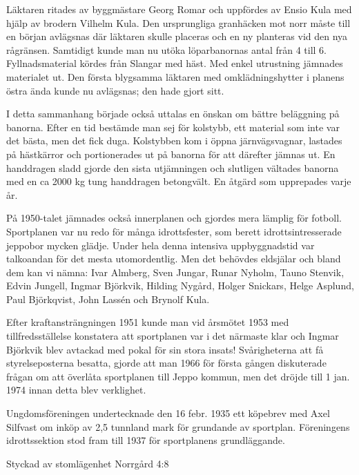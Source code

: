 Läktaren ritades av byggmästare Georg Romar och uppfördes av Ensio Kula med hjälp av brodern Vilhelm Kula. Den ursprungliga granhäcken mot norr måste till en början avlägsnas där läktaren skulle placeras och en ny planteras vid den nya rågränsen. Samtidigt kunde man nu utöka löparbanornas antal från 4 till 6. Fyllnadsmaterial kördes från Slangar med häst. Med enkel utrustning jämnades materialet ut. Den första blygsamma läktaren med omklädningshytter i planens östra ända kunde nu avlägsnas; den hade gjort sitt.

I detta sammanhang började också uttalas en önskan om bättre beläggning på banorna. Efter en tid bestämde man sej för kolstybb, ett material som inte var det bästa, men det fick duga. Kolstybben kom i öppna järnvägsvagnar, lastades på hästkärror och portionerades ut på banorna för att därefter jämnas ut. En handdragen sladd gjorde den sista utjämningen och slutligen vältades banorna med en ca 2000 kg tung handdragen betongvält. En åtgärd som upprepades varje år.

På 1950-talet jämnades också innerplanen och gjordes mera lämplig för fotboll. Sportplanen var nu redo för många idrottsfester, som berett idrottsintresserade jeppobor mycken glädje. Under hela denna intensiva uppbyggnadstid var talkoandan för det mesta utomordentlig. Men det behövdes eldsjälar och bland dem kan vi nämna: Ivar Almberg, Sven Jungar, Runar Nyholm, Tauno Stenvik, Edvin Jungell, Ingmar Björkvik, Hilding Nygård, Holger Snickars, Helge Asplund, Paul Björkqvist, John Lassén och Brynolf Kula.

Efter kraftansträngningen 1951 kunde man vid årsmötet 1953 med tillfredsställelse konstatera att sportplanen var i det närmaste klar och Ingmar Björkvik blev avtackad med pokal för sin stora insats! Svårigheterna att få styrelseposterna besatta, gjorde att man 1966 för första gången diskuterade frågan om att överlåta sportplanen till Jeppo kommun, men det dröjde till 1 jan. 1974 innan detta blev verklighet.


Ungdomsföreningen undertecknade den 16 febr. 1935 ett köpebrev med Axel Silfvast om inköp av 2,5 tunnland mark för grundande av sportplan. Föreningens idrottssektion stod fram till 1937 för sportplanens grundläggande.



Styckad av stomlägenhet Norrgård 4:8


